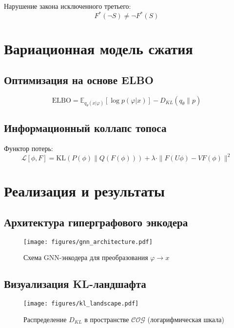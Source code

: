 \documentclass[12pt, a4paper]{article}
\begin{document}
Нарушение закона исключенного третьего:
\begin{equation}
F^*(\neg S) \neq \neg F^*(S)
\end{equation}

\section{Вариационная модель сжатия}

\subsection{Оптимизация на основе ELBO}

\begin{equation}
\text{ELBO} = \mathbb{E}_{q_\theta(x|\varphi)}[\log p(\varphi|x)] - D_{KL}(q_\theta \parallel p)
\end{equation}

\subsection{Информационный коллапс топоса}

Функтор потерь:
\begin{equation}
\mathcal{L}[\phi, F] = \mathrm{KL}(P(\phi) \parallel Q(F(\phi))) + \lambda \cdot \|F(U\phi) - VF(\phi)\|^2
\end{equation}

\section{Реализация и результаты}

\subsection{Архитектура гиперграфового энкодера}

\begin{figure}[h]
\centering
\texttt{[image: figures/gnn\_architecture.pdf]}
\caption{Схема GNN-энкодера для преобразования $\varphi \rightarrow x$}
\end{figure}

\subsection{Визуализация KL-ландшафта}

\begin{figure}[h]
\centering
\texttt{[image: figures/kl\_landscape.pdf]}
\caption{Распределение $D_{KL}$ в пространстве $\mathcal{COG}$ (логарифмическая шкала)}
\end{figure}
\end{document}
